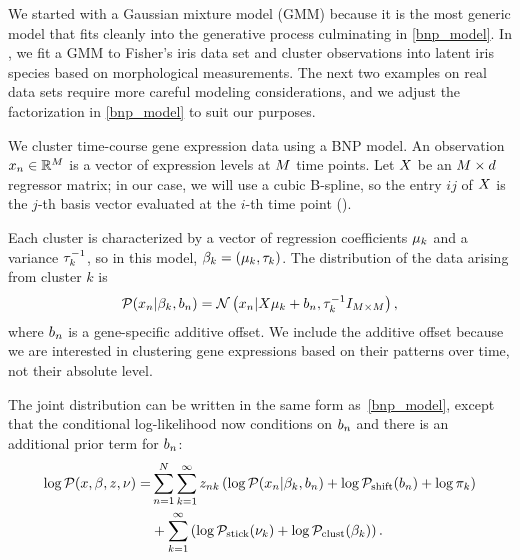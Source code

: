 We started with a Gaussian mixture model (GMM)
because it is the most generic model that fits cleanly into the
generative process culminating in \eqref{bnp_model}.
In , we fit a GMM to Fisher's iris data set and
cluster observations into latent iris species based on morphological measurements.
The next two examples on real data sets require more careful modeling considerations,
and we adjust the factorization in \eqref{bnp_model} to suit our purposes.


\begin{ex}

We cluster time-course gene expression data using a BNP model.
An observation $x_n\in\mathbb{R}^M$ is a vector of expression levels at $M$
time points.
Let $X$ be an $M \times d$ regressor matrix;
in our case, we will use a cubic B-spline, so the entry $ij$ of $X$
is the $j$-th basis vector evaluated at the $i$-th time point ().

Each cluster is characterized by a vector of regression coefficients
$\mu_k$ and a variance $\tau^{-1}_k$, so
in this model, $\beta_k = (\mu_k, \tau_k)$.
The distribution of the data arising from cluster $k$ is
\begin{align*}
\mathcal{P}(x_n | \beta_k, b_n) =
\mathcal{N}\left(x_n | X\mu_k + b_n,
\tau_k^{-1}I_{M \times M}\right),
\end{align*}
%
where $b_{n}$ is a gene-specific additive offset.
We include the additive offset because we
are interested in clustering gene expressions based on their patterns over time,
not their absolute level.

The joint distribution can be written in the same form as~\eqref{bnp_model},
except that the conditional log-likelihood now conditions on $b_n$
and there is an additional prior term for $b_n$:
\begin{align*}
\log \mathcal{P}(x, \beta, z, \nu) =&
    \sum_{n=1}^N \sum_{k=1}^{\infty}
        z_{nk} \left(
            \log \mathcal{P}(x_n \vert \beta_k, b_n) + \log \mathcal{P}_{\mathrm{shift}}(b_n) + \log \pi_k
        \right)  \\
    &{} + \sum_{k=1}^{\infty} \left(
        \log \mathcal{P}_{\mathrm{stick}}(\nu_{k}) + \log \mathcal{P}_{\mathrm{clust}}(\beta_k)
    \right).
\end{align*}

\end{ex}

